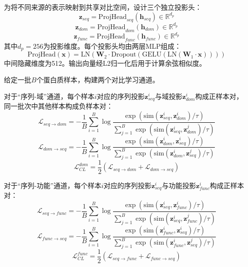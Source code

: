 为将不同来源的表示映射到共享对比空间，设计三个独立投影头：
\begin{equation}
    \mathbf{z}_{seq} = \text{ProjHead}_{seq}(\mathbf{h}_{seq}) \in \mathbb{R}^{d_p}
\end{equation}
\begin{equation}
    \mathbf{z}_{dom} = \text{ProjHead}_{dom}(\mathbf{h}_{dom}) \in \mathbb{R}^{d_p}
\end{equation}
\begin{equation}
    \mathbf{z}_{func} = \text{ProjHead}_{func}(\mathbf{h}_{func}) \in \mathbb{R}^{d_p}
\end{equation}
其中$d_p=256$为投影维度。每个投影头均由两层MLP组成：
\begin{equation}
    \text{ProjHead}(\mathbf{x}) = \text{LN}\!\left(\mathbf{W}_2 \cdot \text{Dropout}\!\left(\text{GELU}\!\left(\text{LN}(\mathbf{W}_1 \cdot \mathbf{x})\right)\right)\right)
\end{equation}
中间隐藏维度为512。输出向量经L2归一化后用于计算余弦相似度。

给定一批$B$个蛋白质样本，构建两个对比学习通道。

对于“序列-域”通道，每个样本$i$对应的序列投影$\mathbf{z}_{seq}^i$与域投影$\mathbf{z}_{dom}^i$构成正样本对，同一批次中其他样本构成负样本对：
\begin{equation}
    \mathcal{L}_{seq \to dom} = -\frac{1}{B}\sum_{i=1}^{B}
    \log
    \frac{\exp(\text{sim}(\mathbf{z}_{seq}^i,\mathbf{z}_{dom}^i)/\tau)}
    {\sum_{j=1}^{B}\exp(\text{sim}(\mathbf{z}_{seq}^i,\mathbf{z}_{dom}^j)/\tau)}
\end{equation}
\begin{equation}
    \mathcal{L}_{dom \to seq} = -\frac{1}{B}\sum_{i=1}^{B}
    \log
    \frac{\exp(\text{sim}(\mathbf{z}_{dom}^i,\mathbf{z}_{seq}^i)/\tau)}
    {\sum_{j=1}^{B}\exp(\text{sim}(\mathbf{z}_{dom}^i,\mathbf{z}_{seq}^j)/\tau)}
\end{equation}
\begin{equation}
    \mathcal{L}_{CL}^{dom} = \frac{1}{2}\left(\mathcal{L}_{seq \to dom} + \mathcal{L}_{dom \to seq}\right)
\end{equation}

对于“序列-功能”通道，每个样本$i$对应的序列投影$\mathbf{z}_{seq}^i$与功能投影$\mathbf{z}_{func}^i$构成正样本对：
\begin{equation}
    \mathcal{L}_{seq \to func} = -\frac{1}{B}\sum_{i=1}^{B}
    \log
    \frac{\exp(\text{sim}(\mathbf{z}_{seq}^i,\mathbf{z}_{func}^i)/\tau)}
    {\sum_{j=1}^{B}\exp(\text{sim}(\mathbf{z}_{seq}^i,\mathbf{z}_{func}^j)/\tau)}
\end{equation}
\begin{equation}
    \mathcal{L}_{func \to seq} = -\frac{1}{B}\sum_{i=1}^{B}
    \log
    \frac{\exp(\text{sim}(\mathbf{z}_{func}^i,\mathbf{z}_{seq}^i)/\tau)}
    {\sum_{j=1}^{B}\exp(\text{sim}(\mathbf{z}_{func}^i,\mathbf{z}_{seq}^j)/\tau)}
\end{equation}
\begin{equation}
    \mathcal{L}_{CL}^{func} = \frac{1}{2}\left(\mathcal{L}_{seq \to func} + \mathcal{L}_{func \to seq}\right)
\end{equation}

